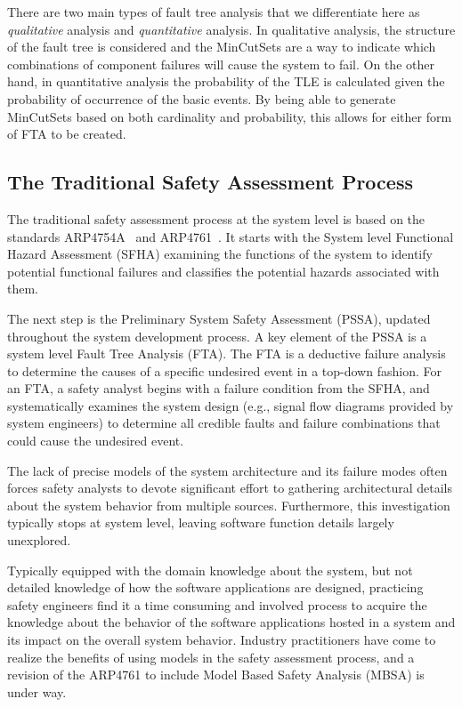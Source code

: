 There are two main types of fault tree analysis that we differentiate here as \textit{qualitative} analysis and \textit{quantitative} analysis. In qualitative analysis, the structure of the fault tree is considered and the MinCutSets are a way to indicate which combinations of component failures will cause the system to fail. On the other hand, in quantitative analysis the probability of the TLE is calculated given the probability of occurrence of the basic events. By being able to generate MinCutSets
based on both cardinality and probability, this allows for either form of FTA to be created. 

\subsection{The Traditional Safety Assessment Process}
The traditional safety assessment process at the system level is based on the standards ARP4754A~\cite{SAE:ARP4754A} and ARP4761~\cite{SAE:ARP4761}. It starts with the System level Functional Hazard Assessment (SFHA) examining the functions of the system to identify potential functional failures and classifies the potential hazards associated with them. 

The next step is the Preliminary System Safety Assessment (PSSA), updated throughout the system development process. A key element of the PSSA is a system level Fault Tree Analysis (FTA).  The FTA is a deductive failure analysis to determine the causes of a specific undesired event in a top-down fashion. For an FTA, a safety analyst begins with a failure condition from the SFHA, and systematically examines the system design (e.g., signal flow diagrams provided by system engineers) to determine all credible faults and failure combinations that could cause the undesired event. 

The lack of precise models of the system architecture and its failure modes often forces safety analysts to devote significant effort to gathering architectural details about the system behavior from multiple sources. Furthermore, this investigation typically stops at system level, leaving software function details largely unexplored.

Typically equipped with the domain knowledge about the system, but not detailed knowledge of how the software applications are designed, practicing safety engineers find it a time consuming and involved process to acquire the knowledge about the behavior of the software applications hosted in a system and its impact on the overall system behavior.
Industry practitioners have come to realize the benefits of using models in the safety assessment process, and a revision of the ARP4761 to include Model Based Safety Analysis (MBSA) is under way. %

